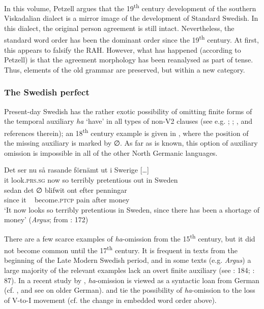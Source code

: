 \documentclass[output=paper]{langscibook}
\begin{document}
In this volume, Petzell argues that the 19\textsuperscript{th} century development of the southern Viskadalian dialect is a mirror image of the development of Standard Swedish. In this dialect, the original person agreement is still intact. Nevertheless, the standard word order has been the dominant order since the 19\textsuperscript{th} century. At first, this appears to falsify the RAH. However, what has happened (according to Petzell) is that the agreement morphology has been reanalysed as part of tense. Thus, elements of the old grammar are preserved, but within a new category.


\subsubsection{ The Swedish perfect}\label{sec:intro:3.1.2}


Present-day Swedish has the rather exotic possibility of omitting finite forms of the temporal auxiliary \textit{ha} ‘have’ in all types of non-V2 clauses (see e.g. \citealt{Julien2002}; \citealt{AndreassonEtAl2004}; \citealt{Backstrom2019}, and references therein); an 18\textsuperscript{th} century example is given in , where the position of the missing auxiliary is marked by ∅. As far as is known, this option of auxiliary omission is impossible in all of the other North Germanic languages.


\ea\label{ex:intro:6}
\ea
\gll  Det     ser         nu   så rasande   förnämt   ut     i   Swerige […] \\
it     look.\textsc{prs.sg}   now   so terribly   pretentious out in   Sweden\\

\gll  sedan   det ∅ blifwit     ont     efter penningar\\
since   it  ~ become\textsc{.ptcp}  pain    after money\\

\glt ‘It now looks so terribly pretentious in Sweden, since there has been a shortage of money’ (\textit{Argus}; from \citealt{Johannisson1945}: 172)
\z
\z


There are a few scarce examples of \textit{ha}{}-omission from the 15\textsuperscript{th} century, but it did not become common until the 17\textsuperscript{th} century. It is frequent in texts from the beginning of the Late Modern Swedish period, and in some texts (e.g. \textit{Argus}) a large majority of the relevant examples lack an overt finite auxiliary (see \citealt{Johannisson1945}: 184; \citealt{Backstrom2019}: 87). In a recent study by \citet{Backstrom2019}, \textit{ha}{}-omission is viewed as a syntactic loan from German (cf. \citealt{Johannisson1945}, and see \citealt{Breitbarth2005} on older German). \citet{Larsson2009} and \citet{Sangfelt2019} tie the possibility of \textit{ha}{}-omission to the loss of V-to-I movement (cf. the change in embedded word order above).
\end{document}
